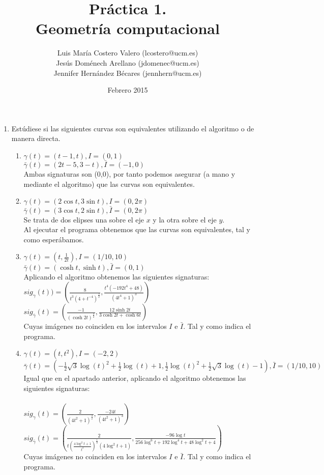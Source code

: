 \documentclass[12pt,a4paper]{article}
\title{Práctica 1. \\ Geometría computacional}
\author{Luis María Costero Valero (lcostero@ucm.es)\\ Jesús Doménech
  Arellano (jdomenec@ucm.es) \\ Jennifer Hernández Bécares (jennhern@ucm.es)}
\date{Febrero 2015}
\begin{document}
\maketitle
\doublespace

\begin{enumerate}
\item Estúdiese si las siguientes curvas son equivalentes utilizando el
  algoritmo o de manera directa.
  \begin{enumerate}
  \item $\gamma(t)=(t-1,t),I=(0,1)$ \\
    $\bar{\gamma}(t)=(2t-5,3-t),\bar{I}=(-1,0)$ \\ Ambas signaturas son
    (0,0), por tanto podemos asegurar (a mano y mediante el algoritmo) que
    las curvas son equivalentes. \\
  \item $\gamma(t)=(2\cos t,3\sin t),I=(0,2\pi)$ \\
    $\bar{\gamma}(t)=(3\cos t,2\sin t),\bar{I}=(0,2\pi)$ \\ 
    Se trata de dos elipses una sobre el eje $x$ y la otra sobre el
    eje $y$.\\
    Al ejecutar el programa obtenemos que las curvas son
    equivalentes, tal y como esperábamos. 
  \item $\gamma(t)=(t,\frac{1}{2t}),I=(1/10, 10)$ \\
    $\bar{\gamma}(t)=(\cosh t,\sinh t),\bar{I}=(0,1)$ \\
    Aplicando el algoritmo obtenemos las siguientes signaturas:\\
    $sig_{\gamma}(t)) = \left(\frac{8}{t^{3}(4 + t^{-4})^{\frac{3}{2}}},
    \frac{t^{4}(-192t^{4} + 48)}{(4t^{4} + 1)^{3}}\right)$ \\
    $sig_{\bar{\gamma}}(t) = \left(\frac{-1}{(\cosh
      2t)^{\frac{3}{2}}},\frac{12\sinh 2t}{3\cosh 2t + \cosh 6t}\right)$ \\
    Cuyas imágenes no coinciden en los intervalos $I$ e $\bar{I}$. Tal
    y como indica el programa.
  \item $\gamma(t)=(t,t^{2}),I=(-2,2)$ 
    $\bar{\gamma}(t)=(-\frac{1}{2}\sqrt{3}\log(t)^{2}+\frac{1}{2}\log(t)+1,\frac{1}{2}\log(t)^{2}+\frac{1}{2}\sqrt{3}\log(t)-1),\bar{I}=(1/10,10)$
    \\Igual que en el apartado anterior, aplicando el algoritmo
    obtenemos las siguientes signaturas:\\
    \\$sig_{\gamma}(t) = \left(\frac{2}{(4t^{2} + 1)^{\frac{3}{2}}},
    \frac{-24t}{(4t^{2} + 1)^3}\right)$
    \\$sig_{\bar{\gamma}}(t) = \left(\frac{2}{t(\frac{4\log^2 t +
    1}{t^2})^{\frac{1}{2}}(4\log^2 t + 1)}, \frac{-96\log t}{256\log^6
  t + 192\log^4 t + 48\log^2 t + 4}\right)$
\\Cuyas imágenes no coinciden en los intervalos $I$ e $\bar{I}$. Tal
    y como indica el programa.
  \end{enumerate}


\end{enumerate}
\end{document}
